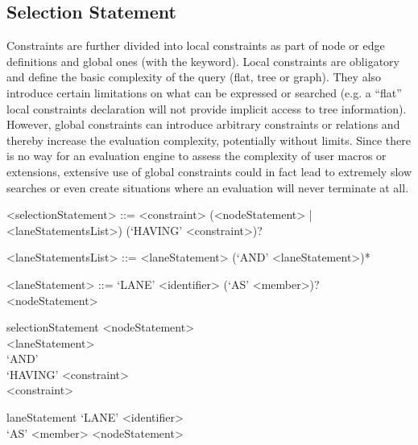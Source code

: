 \documentclass[11pt,a4paper]{report}
\begin{document}
\subsection{Selection Statement}
\label{sec:selection}

Constraints are further divided into local constraints as part of node or edge definitions and global ones (with the  keyword). 
Local constraints are obligatory and define the basic complexity of the query (flat, tree or graph). 
They also introduce certain limitations on what can be expressed or searched (e.g. a ``flat'' local constraints declaration will not provide implicit access to tree information). 
However, global constraints can introduce arbitrary constraints or relations and thereby increase the evaluation complexity, potentially without limits. 
Since there is no way for an evaluation engine to assess the complexity of user macros or extensions, extensive use of global constraints could in fact lead to extremely slow searches or even create situations where an evaluation will never terminate at all.

\begin{gram}
	\label{gram:selection}
	\begin{grammar}	
		<selectionStatement> ::= <constraint>
		\alt (<nodeStatement> | <laneStatementsList>) (`HAVING' <constraint>)?	
		
		<laneStatementsList> ::= <laneStatement> (`AND' <laneStatement>)*
		
		<laneStatement> ::= `LANE' <identifier> (`AS' <member>)? <nodeStatement>
	\end{grammar}
	\diagsep
	
	\begin{rrdiag*}{selectionStatement}
		\sst
			\sst <nodeStatement> \\ \srp <laneStatement> \\ `AND' \erp \est
				\sst \\ `HAVING' <constraint> \est \\ 
			<constraint> 
		\est
	\end{rrdiag*}

	\begin{rrdiag*}{laneStatement}
		`LANE' <identifier> \sst \\ `AS' <member> \est <nodeStatement>
	\end{rrdiag*}
\end{gram}

\end{document}
